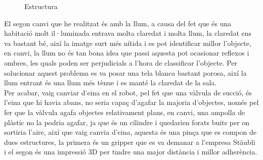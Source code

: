 ﻿\documentclass[10pt,a4paper,twocolumn,twoside]{article}
\begin{document}
\begin{figure}[h]
 \centering
 \caption{Estructura}
 \label{f:tx60}
\end{figure}

El segon canvi que he realitzat és amb la llum, a causa del fet que és una habitació molt il·luminada entrava molta claredat i molta llum, la claredat ens va bastant bé, així la imatge surt més nítida i es pot identificar millor l'objecte, en canvi, la llum no és tan bona idea que passi aquesta pot ocasionar reflexos i ombres, les quals poden ser perjudicials a l'hora de classificar l'objecte. Per solucionar aquest problema es va posar una tela blanca bastant porosa, així la llum entrant és una llum més tènue i es manté la claredat de la sala.
\\

Per acabar, vaig canviar d'eina en el robot, pel fet que una vàlvula de succió, és l'eina que hi havia abans, no seria capaç d'agafar la majoria d'objectes, només pel fer que la vàlvula agafa objectes relativament plans, en canvi, una ampolla de plàstic no la podria agafar, ja que és un cilindre i quedarien forats buits per on sortiria l'aire, així que vaig canvia d'eina, aquesta és una pinça que es compon de dues estructures, la primera és un gripper\cite{Gripper} que es va demanar a l'empresa Stäubli i el segon és una impressió 3D per tindre una major distància i millor adherència.
\end{document}
